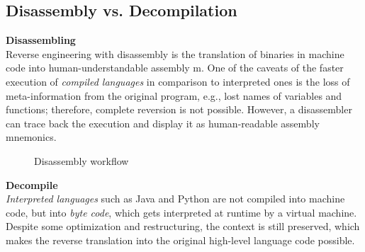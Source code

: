 \documentclass[seminar]{plai}
\begin{document}
\subsection{Disassembly vs. Decompilation}
\label{disassembly-vs-decompilation}

\textbf{Disassembling}\\
Reverse engineering with disassembly is the translation of binaries in machine code into human-understandable assembly m.
One of the caveats of the faster execution of \textit{compiled languages} in comparison to interpreted ones is the loss of meta-information from the original program, e.g., lost names of variables and functions; therefore, complete reversion is not possible.
However, a disassembler can trace back the execution and display it as human-readable assembly mnemonics.\cite{reverse-engineering-vs-disassembly}\\

\begin{figure}[htbp]
\centering
{}
\caption{Disassembly workflow\cite{reverse-engineering-vs-disassembly}}
\label{fig:compile-disassemble}
\end{figure}

\noindent\textbf{Decompile}\\
\textit{Interpreted languages} such as Java and Python are not compiled into machine code, but into \textit{byte code}, which gets interpreted at runtime by a virtual machine. Despite some optimization and restructuring, the context is still preserved, which makes the reverse translation into the original high-level language code possible.\cite{reverse-engineering-vs-disassembly}
\end{document}
